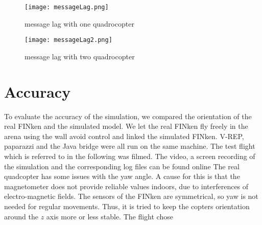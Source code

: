 \begin{figure}[h!]
 \begin{center}
  \texttt{[image: messageLag.png]}
 \end{center}
  \caption{message lag with one quadrocopter\label{fig:messageLag}}
\end{figure}

\begin{figure}[h!]
 \begin{center}
  \texttt{[image: messageLag2.png]}
 \end{center}
  \caption{message lag with two quadrocopter\label{fig:messageLag2}}
\end{figure}




\section{Accuracy}

To evaluate the accuracy of the simulation, we compared the orientation of the real FINken and the simulated model.  
We let the real FINken fly freely in the arena using the wall avoid control and linked the simulated FINken.
V-REP, paparazzi and the Java bridge were all run on the same machine.
The test flight which is referred to in the following was filmed.
The video, a screen recording of the simulation and the corresponding log files can be found online  
The real quadcopter has some issues with the yaw angle. 
A cause for this is that the magnetometer does not provide reliable values indoors, due to interferences of electro-magnetic fields.
The sensors of the FINken are symmetrical, so yaw is not needed for regular movements.
Thus, it is tried to keep the copters orientation around the $z$ axis more or less stable.
The flight chose

